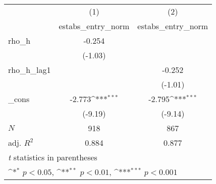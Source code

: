 {
\def\sym#1{\ifmmode^{#1}\else\(^{#1}\)\fi}
\begin{tabular}{l*{2}{c}}
\toprule
            &\multicolumn{1}{c}{(1)}&\multicolumn{1}{c}{(2)}\\
            &\multicolumn{1}{c}{estabs\_entry\_norm}&\multicolumn{1}{c}{estabs\_entry\_norm}\\
\midrule
rho\_h       &      -0.254         &                     \\
            &     (-1.03)         &                     \\
\addlinespace
rho\_h\_lag1  &                     &      -0.252         \\
            &                     &     (-1.01)         \\
\addlinespace
\_cons      &      -2.773\sym{***}&      -2.795\sym{***}\\
            &     (-9.19)         &     (-9.14)         \\
\midrule
\(N\)       &         918         &         867         \\
adj. \(R^{2}\)&       0.884         &       0.877         \\
\bottomrule
\multicolumn{3}{l}{\footnotesize \textit{t} statistics in parentheses}\\
\multicolumn{3}{l}{\footnotesize \sym{*} \(p<0.05\), \sym{**} \(p<0.01\), \sym{***} \(p<0.001\)}\\
\end{tabular}
}
